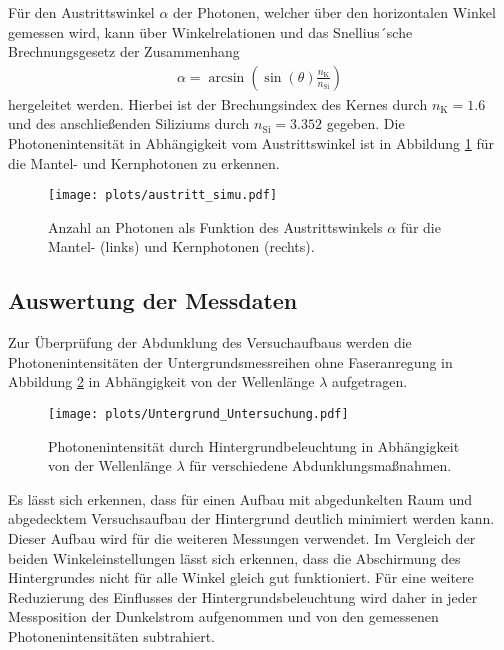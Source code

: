 Für den Austrittswinkel $\alpha$ der Photonen, welcher über den horizontalen Winkel gemessen wird, kann über Winkelrelationen und das Snellius´sche Brechnungsgesetz der Zusammenhang
\begin{align}
    \alpha = \arcsin \left( \sin(\theta)\frac{n_\mathrm{K}}{n_\mathrm{Si}}\right)
\end{align} 
hergeleitet werden. Hierbei ist der Brechungsindex des Kernes durch $n_\mathrm{K} = 1.6$ \cite{anleitung} und des anschließenden Siliziums durch $n_\mathrm{Si} = 3.352$ \cite{si} gegeben.
Die Photonenintensität in Abhängigkeit vom Austrittswinkel ist in Abbildung \ref{fig:austritt_simu} für die Mantel- und Kernphotonen zu erkennen.
\begin{figure}
    \centering
    \texttt{[image: plots/austritt\_simu.pdf]}
    \caption{Anzahl an Photonen als Funktion des Austrittswinkels $\alpha$ für die Mantel- (links) und Kernphotonen (rechts). }
    \label{fig:austritt_simu}
\end{figure}
\FloatBarrier

\subsection{Auswertung der Messdaten}
Zur Überprüfung der Abdunklung des Versuchaufbaus werden die Photonenintensitäten der Untergrundsmessreihen ohne Faseranregung in Abbildung \ref{fig:Untergrund_Untersuchung} in Abhängigkeit von der Wellenlänge $\lambda$ aufgetragen.
\begin{figure}
    \centering
    \texttt{[image: plots/Untergrund\_Untersuchung.pdf]}
    \caption{Photonenintensität durch Hintergrundbeleuchtung in Abhängigkeit von der Wellenlänge $\lambda$ für verschiedene Abdunklungsmaßnahmen.}
    \label{fig:Untergrund_Untersuchung}
\end{figure}
\FloatBarrier
Es lässt sich erkennen, dass für einen Aufbau mit abgedunkelten Raum und abgedecktem Versuchsaufbau der Hintergrund deutlich minimiert werden kann. Dieser Aufbau wird für die weiteren Messungen verwendet. 
Im Vergleich der beiden Winkeleinstellungen lässt sich erkennen, dass die Abschirmung des Hintergrundes nicht für alle Winkel gleich gut funktioniert. 
Für eine weitere Reduzierung des Einflusses der Hintergrundsbeleuchtung wird daher in jeder Messposition der Dunkelstrom aufgenommen und von den gemessenen Photonenintensitäten subtrahiert.

